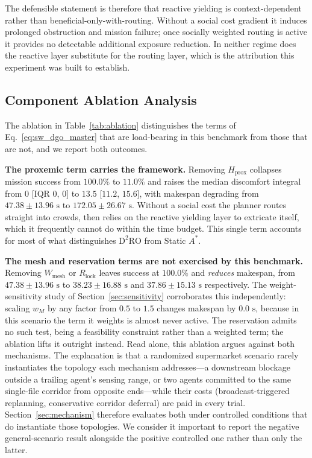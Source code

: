 \documentclass[journal]{IEEEtran}
\begin{document}
The defensible statement is therefore that reactive yielding is context-dependent rather than beneficial-only-with-routing. Without a social cost gradient it induces prolonged obstruction and mission failure; once socially weighted routing is active it provides no detectable additional exposure reduction. In neither regime does the reactive layer substitute for the routing layer, which is the attribution this experiment was built to establish.

\subsection{Component Ablation Analysis}
The ablation in Table~\ref{tab:ablation} distinguishes the terms of Eq.~\eqref{eq:sw_dgo_master} that are load-bearing in this benchmark from those that are not, and we report both outcomes.

\textbf{The proxemic term carries the framework.} Removing $H_{\text{prox}}$ collapses mission success from $100.0\%$ to $11.0\%$ and raises the median discomfort integral from $0$ [IQR $0$, $0$] to $13.5$ [$11.2$, $15.6$], with makespan degrading from $47.38 \pm 13.96\text{ s}$ to $172.05 \pm 26.67\text{ s}$. Without a social cost the planner routes straight into crowds, then relies on the reactive yielding layer to extricate itself, which it frequently cannot do within the time budget. This single term accounts for most of what distinguishes $\text{D}^2\text{RO}$ from Static $A^*$.

\textbf{The mesh and reservation terms are not exercised by this benchmark.} Removing $W_{\text{mesh}}$ or $R_{\text{lock}}$ leaves success at $100.0\%$ and \emph{reduces} makespan, from $47.38 \pm 13.96\text{ s}$ to $38.23 \pm 16.88\text{ s}$ and $37.86 \pm 15.13\text{ s}$ respectively. The weight-sensitivity study of Section~\ref{sec:sensitivity} corroborates this independently: scaling $w_M$ by any factor from $0.5$ to $1.5$ changes makespan by $0.0\text{ s}$, because in this scenario the term it weights is almost never active. The reservation admits no such test, being a feasibility constraint rather than a weighted term; the ablation lifts it outright instead. Read alone, this ablation argues against both mechanisms. The explanation is that a randomized supermarket scenario rarely instantiates the topology each mechanism addresses---a downstream blockage outside a trailing agent's sensing range, or two agents committed to the same single-file corridor from opposite ends---while their costs (broadcast-triggered replanning, conservative corridor deferral) are paid in every trial. Section~\ref{sec:mechanism} therefore evaluates both under controlled conditions that do instantiate those topologies. We consider it important to report the negative general-scenario result alongside the positive controlled one rather than only the latter.
\end{document}

